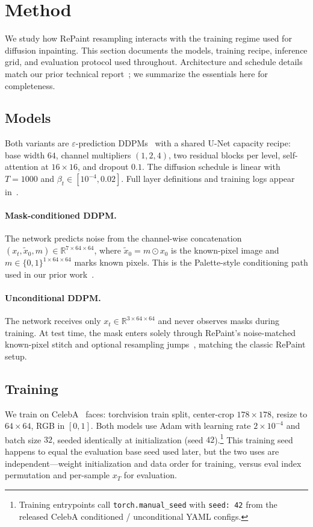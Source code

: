 \section{Method}
\label{sec:method}

We study how RePaint resampling interacts with the training regime used for diffusion inpainting.
This section documents the models, training recipe, inference grid, and evaluation protocol used throughout.
Architecture and schedule details match our prior technical report~\citep{hamouda2026protocol}; we summarize the essentials here for completeness.

\subsection{Models}
\label{sec:models}
Both variants are $\varepsilon$-prediction DDPMs~\citep{ho2020ddpm} with a shared U-Net capacity recipe:
base width $64$, channel multipliers $(1,2,4)$, two residual blocks per level, self-attention at $16{\times}16$, and dropout $0.1$.
The diffusion schedule is linear with $T{=}1000$ and $\beta_t\in[10^{-4},0.02]$.
Full layer definitions and training logs appear in~\citet{hamouda2026protocol}.

\paragraph{Mask-conditioned DDPM.}
The network predicts noise from the channel-wise concatenation
$(x_t,\tilde{x}_0,m)\in\mathbb{R}^{7\times64\times64}$,
where $\tilde{x}_0{=}m\odot x_0$ is the known-pixel image and $m\in\{0,1\}^{1\times64\times64}$ marks known pixels.
This is the Palette-style conditioning path used in our prior work~\citep{hamouda2026protocol,saharia2022palette}.

\paragraph{Unconditional DDPM.}
The network receives only $x_t\in\mathbb{R}^{3\times64\times64}$ and never observes masks during training.
At test time, the mask enters solely through RePaint's noise-matched known-pixel stitch and optional resampling jumps~\citep{lugmayr2022repaint}, matching the classic RePaint setup.

\subsection{Training}
\label{sec:training}
We train on CelebA~\citep{liu2015celeba} faces: torchvision train split, center-crop $178{\times}178$, resize to $64{\times}64$, RGB in $[0,1]$.
Both models use Adam with learning rate $2{\times}10^{-4}$ and batch size $32$, seeded identically at initialization (seed $42$).\footnote{%
Training entrypoints call \texttt{torch.manual\_seed} with \texttt{seed: 42} from the released CelebA conditioned / unconditional YAML configs.}
This training seed happens to equal the evaluation base seed used later, but the two uses are independent---weight initialization and data order for training, versus eval index permutation and per-sample $x_T$ for evaluation.

